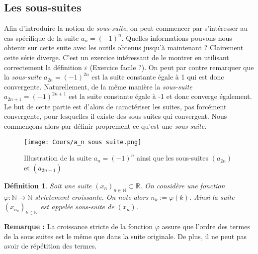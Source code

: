 \documentclass[a4paper, 12pt, french, twoside]{article}
\newtheorem{defi}[theorem]{Définition}
\newcommand{\Nn}{{\mathbb{N}}}
\newcommand{\Rr}{{\mathbb{R}}}
\begin{document}
\subsection{Les sous-suites}
Afin d'introduire la notion de \textit{sous-suite}, on peut commencer par s'intéresser au cas spécifique de la suite $a_n = (-1)^n$. Quelles informations pouvons-nous obtenir sur cette suite avec les outils obtenus jusqu'à maintenant ? 
Clairement cette série diverge. C'est un exercice intéressant de le montrer en utilisant correctement la définition $\varepsilon$ (Exercice facile ?). On peut par contre remarquer que la \textit{sous-suite} $a_{2n} = (-1)^{2n}$ est la suite constante égale à 1 qui est donc convergente. Naturellement, de la même manière la \textit{sous-suite} $a_{2n+1} = (-1)^{2n+1}$ est la suite constante égale à -1 et donc converge également. Le but de cette partie est d'alors de caractériser les suites, pas forcément convergente, pour lesquelles il existe des sous suites qui convergent. Nous commençons alors par définir proprement ce qu'est une \textit{sous-suite}.
\begin{figure}[H]
    \centering
    \texttt{[image: Cours/a\_n sous suite.png]}
    \caption{Illustration de la suite $a_n = (-1)^n$ ainsi que les sous-suites $(a_{2n})$ et $(a_{2n+1})$ }
    \label{fig:enter-label}
\end{figure}

\begin{defi}
 Soit une suite $(x_n)_{ n \in \Nn } \subset \Rr $. On considère une fonction $\varphi : \Nn \rightarrow \Nn $ strictement croissante. On note alors $n_k := \varphi(k)$. Ainsi la suite $(x_{n_k})_{k \in \Nn} $ est appelée \textit{sous-suite} de  $(x_n)$. 
 \end{defi}
 
\textbf{Remarque :} La croissance stricte de la fonction $\varphi$ assure que l'ordre des termes de la sous suites est le même que dans la suite originale. De plus, il ne peut pas avoir de répétition des termes. 
\end{document}
